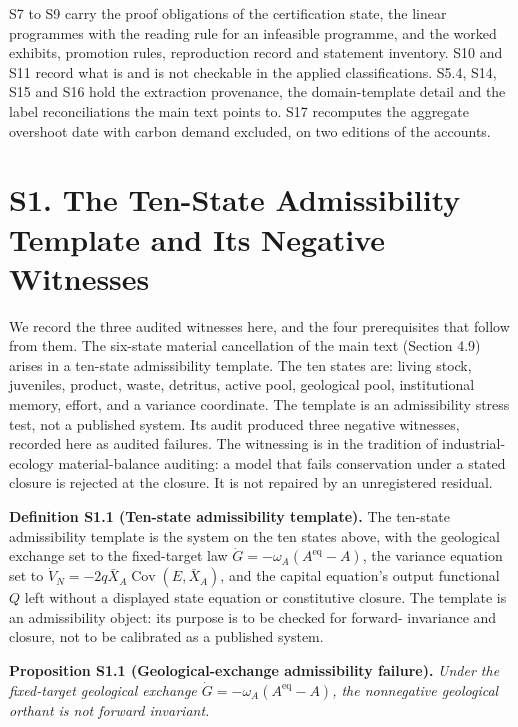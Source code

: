 \documentclass[11pt]{article}
\begin{document}
S7 to S9 carry the proof obligations of the certification state, the linear programmes with the reading rule for an infeasible programme, and the worked exhibits, promotion rules, reproduction record and statement inventory. S10 and S11 record what is and is not checkable in the applied classifications. S5.4, S14, S15 and S16 hold the extraction provenance, the domain-template detail and the label reconciliations the main text points to. S17 recomputes the aggregate overshoot date with carbon demand excluded, on two editions of the accounts.

\vspace{0.8em}

\section*{S1. The Ten-State Admissibility Template and Its Negative Witnesses}\label{s1-the-ten-state-admissibility-template-and-its-negative-witnesses}

We record the three audited witnesses here, and the four prerequisites that follow from them. The six-state material cancellation of the main text (Section 4.9) arises in a ten-state admissibility template. The ten states are: living stock, juveniles, product, waste, detritus, active pool, geological pool, institutional memory, effort, and a variance coordinate. The template is an admissibility stress test, not a published system. Its audit produced three negative witnesses, recorded here as audited failures. The witnessing is in the tradition of industrial-ecology material-balance auditing: a model that fails conservation under a stated closure is rejected at the closure. It is not repaired by an unregistered residual.

\textbf{Definition S1.1 (Ten-state admissibility template).} The ten-state admissibility template is the system on the ten states above, with the geological exchange set to the fixed-target law \(\dot G = -\omega_A(A^{\mathrm{eq}} - A)\), the variance equation set to \(\dot V_N = -2q\bar X_A \operatorname{Cov}(E, \bar X_A)\), and the capital equation's output functional \(Q\) left without a displayed state equation or constitutive closure. The template is an admissibility object: its purpose is to be checked for forward- invariance and closure, not to be calibrated as a published system.

\textbf{Proposition S1.1 (Geological-exchange admissibility failure).} \emph{Under the fixed-target geological exchange \(\dot G = -\omega_A(A^{\mathrm{eq}} - A)\), the nonnegative geological orthant is not forward invariant.}
\end{document}
